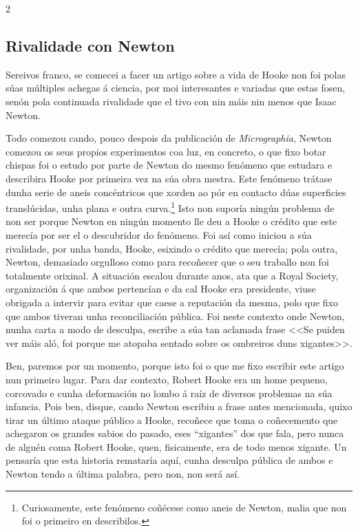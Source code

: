 \begin{refsection}
\begin{multicols}{2}
\subsection*{Rivalidade con Newton}

Sereivos franco, se comecei a facer un artigo sobre a vida de Hooke non foi
polas súas múltiples achegas á ciencia, por moi interesantes e variadas que
estas fosen, senón pola continuada rivalidade que el tivo con nin máis nin
menos que Isaac Newton.

Todo comezou cando, pouco despois da publicación de \textit{Micrographia},
Newton comezou os seus propios experimentos coa luz, en concreto, o que fixo
botar chispas foi o estudo por parte de Newton do mesmo fenómeno que estudara e
describira Hooke por primeira vez na súa obra mestra. Este fenómeno trátase
dunha serie de aneis concéntricos que xorden ao pór en contacto dúas
superficies translúcidas, unha plana e outra curva.\footnote{Curiosamente, este
fenómeno coñécese como aneis de Newton, malia que non foi o primeiro en
describilos.} Isto non suporía ningún problema de non ser porque Newton
en ningún momento lle deu a Hooke o crédito que este merecía por ser el o
descubridor do fenómeno. Foi así como iniciou a súa rivalidade, por unha banda,
Hooke, esixindo o crédito que merecía; pola outra, Newton, demasiado orgulloso
como para recoñecer que o seu traballo non foi totalmente orixinal. A situación
escalou durante anos, ata que a Royal Society, organización á que ambos
pertencían e da cal Hooke era presidente, viuse obrigada a intervir para evitar
que caese a reputación da mesma, polo que fixo que ambos tiveran unha
reconciliación pública. Foi neste contexto onde Newton, nunha carta a modo de
desculpa, escribe a súa tan aclamada frase <<Se puiden ver máis aló, foi porque
me atopaba sentado sobre os ombreiros duns xigantes>>.

Ben, paremos por un momento, porque isto foi o que me fixo escribir este artigo
nun primeiro lugar. Para dar contexto, Robert Hooke era un home pequeno,
corcovado e cunha deformación no lombo á raíz de diversos problemas na súa
infancia. Pois ben, disque, cando Newton escribiu a frase antes mencionada,
quixo tirar un último ataque público a Hooke, recoñece que toma o coñecemento
que achegaron os grandes sabios do pasado, eses ``xigantes'' dos que fala, pero
nunca de alguén coma Robert Hooke, quen, fisicamente, era de todo menos
xigante. Un pensaría que esta historia remataría aquí, cunha desculpa pública
de ambos e Newton tendo a última palabra, pero non, non será así.


\end{multicols}
\end{refsection}
